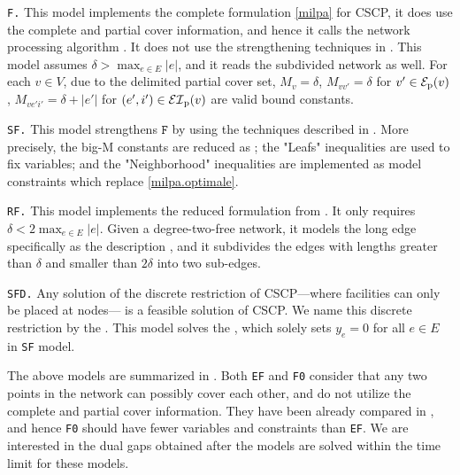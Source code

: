 \texttt{F.}  This model implements the complete formulation \eqref{milpa} for CSCP, it does use the complete and partial cover information, and hence it  calls the network processing algorithm \ncalgo.  It does not use the strengthening techniques in . This model assumes $\delta > \max_{e \in E}|e|$, and it reads the subdivided network as well.  For each $v \in V$, due to the delimited partial cover set,  $M_{v} = \delta$, $M_{vv'} = \delta$ for $v' \in {\mathcal E}_{\mathrm{p}}(v)$, $M_{ve'i'} = \delta + |e'|$ for $(e',i') \in {\mathcal {EI}}_{\mathrm{p}}(v)$ are valid bound constants.

\texttt{SF.} This model strengthens  $\texttt{F}$ by using the techniques described in . %
More precisely, the big-M constants are reduced as ; the "Leafs" inequalities are used to fix variables; and the "Neighborhood" inequalities are implemented as model constraints which replace \eqref{milpa.optimale}.

\texttt{RF.} This model implements the reduced formulation from . It only requires $\delta < 2\max_{e \in E}|e|$. Given a degree-two-free network, it models the long edge specifically as the description , and it subdivides the edges with lengths greater than $\delta$ and smaller than $2\delta$ into two sub-edges.

\texttt{SFD.}  Any solution of the discrete restriction of CSCP---where facilities can only be placed at nodes--- is a feasible solution of CSCP. We name this discrete restriction by the \dfproblem.  This model solves the \dfproblem, which solely sets $y_e = 0$ for all $e \in E$ in \texttt{SF} model.

The above models are summarized in . Both \texttt{EF} and \texttt{F0} consider that any two points in the network can possibly cover each other, and do not utilize the complete and partial cover information. They have been already compared in , and hence \texttt{F0} should have fewer variables and constraints than \texttt{EF}. We are interested in the dual gaps obtained after the models are solved within the time limit for these models.
 
